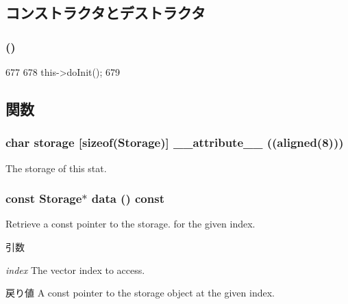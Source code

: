 \subsection{コンストラクタとデストラクタ}
\hypertarget{classStats_1_1ScalarBase_a7f98cb76073bfcf3ad5a22da098bb6c7}{
\subsubsection[{ScalarBase}]{ ()}}
\label{classStats_1_1ScalarBase_a7f98cb76073bfcf3ad5a22da098bb6c7}



\begin{DoxyCode}
677     {
678         this->doInit();
679     }
\end{DoxyCode}


\subsection{関数}
\hypertarget{classStats_1_1ScalarBase_a72ec214acf2091c80c5794662602c42f}{
\subsubsection[{\_\-\_\-attribute\_\-\_\-}]{\setlength{\rightskip}{0pt plus 5cm}char storage \mbox{[}sizeof({\bf Storage})\mbox{]} \_\-\_\-attribute\_\-\_\- ((aligned(8)))}}
\label{classStats_1_1ScalarBase_a72ec214acf2091c80c5794662602c42f}
The storage of this stat. \hypertarget{classStats_1_1ScalarBase_aabedc9303ac5bae8af18ceaeeb7fe44b}{
\subsubsection[{data}]{\setlength{\rightskip}{0pt plus 5cm}const {\bf Storage}$\ast$ data () const}}
\label{classStats_1_1ScalarBase_aabedc9303ac5bae8af18ceaeeb7fe44b}
Retrieve a const pointer to the storage. for the given index. 
\begin{DoxyParams}{引数}
\item[{\em index}]The vector index to access. \end{DoxyParams}
\begin{DoxyReturn}{戻り値}
A const pointer to the storage object at the given index. 
\end{DoxyReturn}



